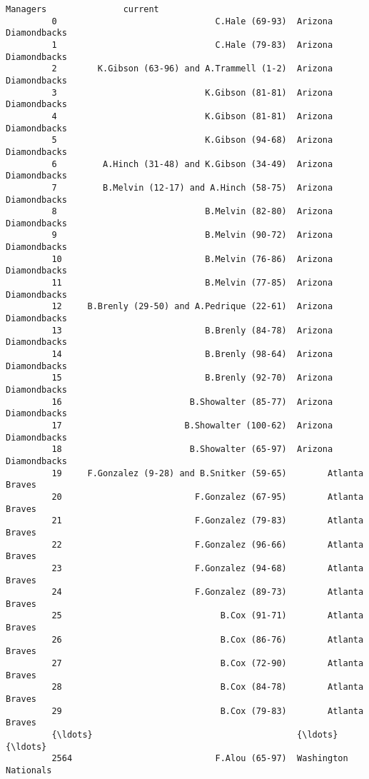 \documentclass[11pt]{article}
\begin{document}
\begin{Verbatim}[commandchars=\\\{\}]
                                               Managers               current  
         0                               C.Hale (69-93)  Arizona Diamondbacks  
         1                               C.Hale (79-83)  Arizona Diamondbacks  
         2        K.Gibson (63-96) and A.Trammell (1-2)  Arizona Diamondbacks  
         3                             K.Gibson (81-81)  Arizona Diamondbacks  
         4                             K.Gibson (81-81)  Arizona Diamondbacks  
         5                             K.Gibson (94-68)  Arizona Diamondbacks  
         6         A.Hinch (31-48) and K.Gibson (34-49)  Arizona Diamondbacks  
         7         B.Melvin (12-17) and A.Hinch (58-75)  Arizona Diamondbacks  
         8                             B.Melvin (82-80)  Arizona Diamondbacks  
         9                             B.Melvin (90-72)  Arizona Diamondbacks  
         10                            B.Melvin (76-86)  Arizona Diamondbacks  
         11                            B.Melvin (77-85)  Arizona Diamondbacks  
         12     B.Brenly (29-50) and A.Pedrique (22-61)  Arizona Diamondbacks  
         13                            B.Brenly (84-78)  Arizona Diamondbacks  
         14                            B.Brenly (98-64)  Arizona Diamondbacks  
         15                            B.Brenly (92-70)  Arizona Diamondbacks  
         16                         B.Showalter (85-77)  Arizona Diamondbacks  
         17                        B.Showalter (100-62)  Arizona Diamondbacks  
         18                         B.Showalter (65-97)  Arizona Diamondbacks  
         19     F.Gonzalez (9-28) and B.Snitker (59-65)        Atlanta Braves  
         20                          F.Gonzalez (67-95)        Atlanta Braves  
         21                          F.Gonzalez (79-83)        Atlanta Braves  
         22                          F.Gonzalez (96-66)        Atlanta Braves  
         23                          F.Gonzalez (94-68)        Atlanta Braves  
         24                          F.Gonzalez (89-73)        Atlanta Braves  
         25                               B.Cox (91-71)        Atlanta Braves  
         26                               B.Cox (86-76)        Atlanta Braves  
         27                               B.Cox (72-90)        Atlanta Braves  
         28                               B.Cox (84-78)        Atlanta Braves  
         29                               B.Cox (79-83)        Atlanta Braves  
         {\ldots}                                        {\ldots}                   {\ldots}  
         2564                            F.Alou (65-97)  Washington Nationals  

\end{Verbatim}
\end{document}
